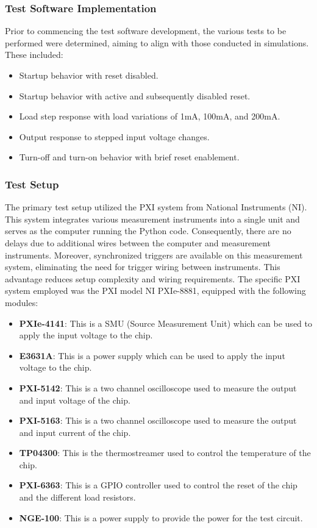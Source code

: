 \subsubsection{Test Software Implementation}
Prior to commencing the test software development, the various tests to be performed were determined, aiming to align with those conducted in simulations. These included:
\begin{itemize}
    \item Startup behavior with reset disabled.
    \item Startup behavior with active and subsequently disabled reset.
    \item Load step response with load variations of 1mA, 100mA, and 200mA.
    \item Output response to stepped input voltage changes.
    \item Turn-off and turn-on behavior with brief reset enablement.
\end{itemize}

\subsubsection{Test Setup}
The primary test setup utilized the PXI system from National Instruments (NI). This system integrates various measurement instruments into a single unit and serves as the computer running the Python code. Consequently, there are no delays due to additional wires between the computer and measurement instruments. Moreover, synchronized triggers are available on this measurement system, eliminating the need for trigger wiring between instruments. This advantage reduces setup complexity and wiring requirements. The specific PXI system employed was the PXI model \glqq{}NI PXIe-8881\grqq{}, equipped with the following modules:

\begin{itemize}
    \item \textbf{PXIe-4141}: This is a SMU (Source Measurement Unit) which can be used to apply the input voltage to the chip.
    \item \textbf{E3631A}: This is a power supply which can be used to apply the input voltage to the chip.
    \item \textbf{PXI-5142}: This is a two channel oscilloscope used to measure the output and input voltage of the chip.
    \item \textbf{PXI-5163}: This is a two channel oscilloscope used to measure the output and input current of the chip.
    \item \textbf{TP04300}: This is the thermostreamer used to control the temperature of the chip.
    \item \textbf{PXI-6363}: This is a GPIO controller used to control the reset of the chip and the different load resistors.
    \item \textbf{NGE-100}: This is a power supply to provide the power for the test circuit.
\end{itemize}

